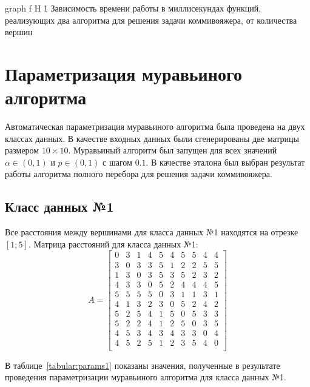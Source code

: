     {graph}
    {f}
    {H}
    {1\textwidth}
    {Зависимость времени работы в миллисекундах функций, реализующих два алгоритма для решения задачи коммивояжера, от количества вершин}

\pagebreak
\section{Параметризация муравьиного алгоритма}

Автоматическая параметризация муравьиного алгоритма была проведена на двух классах данных. 
В качестве входных данных были сгенерированы две матрицы размером $10 \times 10$. 
Муравьиный алгоритм был запущен для всех значений $\alpha \in (0, 1)$ и $p \in (0, 1)$ с шагом $0.1$. 
В качестве эталона был выбран результат работы алгоритма полного перебора для решения задачи коммивояжера.

\subsection{Класс данных №1}

Все расстояния между вершинами для класса данных №1 находятся на отрезке $[1; 5]$. 
Матрица расстояний для класса данных №1:
\begin{equation}
A = 
\begin{bmatrix}
0 & 3 & 1 & 4 & 5 & 4 & 5 & 5 & 4 & 4 \\
3 & 0 & 3 & 3 & 5 & 1 & 2 & 2 & 5 & 5 \\
1 & 3 & 0 & 3 & 5 & 3 & 5 & 2 & 3 & 2 \\
4 & 3 & 3 & 0 & 5 & 2 & 4 & 4 & 4 & 5 \\
5 & 5 & 5 & 5 & 0 & 3 & 1 & 1 & 3 & 1 \\
4 & 1 & 3 & 2 & 3 & 0 & 5 & 2 & 4 & 2 \\
5 & 2 & 5 & 4 & 1 & 5 & 0 & 5 & 3 & 3 \\
5 & 2 & 2 & 4 & 1 & 2 & 5 & 0 & 3 & 5 \\
4 & 5 & 3 & 4 & 3 & 4 & 3 & 3 & 0 & 4 \\
4 & 5 & 2 & 5 & 1 & 2 & 3 & 5 & 4 & 0 \\
\end{bmatrix}
\end{equation}

В таблице~\ref{tabular:params1} показаны значения, полученные в результате проведения параметризации муравьиного алгоритма для класса данных №1.

